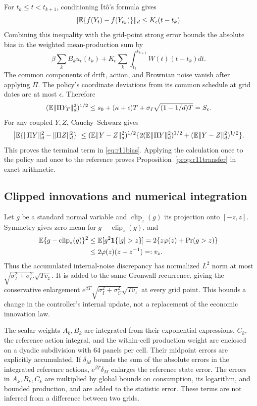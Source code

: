 For $t_k\leq t<t_{k+1}$, conditioning It\^o's formula gives
\[
 \|\mathbb E\{f(Y_t)-f(Y_{t_k})\}\|_d\leq K_\epsilon(t-t_k).
\]
Combining this inequality with the grid-point strong error bounds the absolute bias in the weighted mean-production sum by
\[
 \beta\sum_k B_k u_\epsilon(t_k)+
 K_\epsilon\sum_k\int_{t_k}^{t_{k+1}}W(t)(t-t_k)dt.
\]
The common components of drift, action, and Brownian noise vanish after applying $\Pi$. The policy's coordinate deviations from its common schedule at grid dates are at most $\epsilon$. Therefore
\[
 (\mathbb E\|\Pi Y_T\|_d^2)^{1/2}
 \leq s_0+(\kappa+\epsilon)T+\sigma_I\sqrt{(1-1/d)T}=S_\epsilon.
\]
For any coupled $Y,Z$, Cauchy--Schwarz gives
\[
 \left|\mathbb E\{\|\Pi Y\|_d^2-\|\Pi Z\|_d^2\}\right|
 \leq (\mathbb E\|Y-Z\|_d^2)^{1/2}
       \{2(\mathbb E\|\Pi Y\|_d^2)^{1/2}+(\mathbb E\|Y-Z\|_d^2)^{1/2}\}.
\]
This proves the terminal term in \eqref{eq:r11bias}. Applying the calculation once to the policy and once to the reference proves Proposition~\ref{prop:r11transfer} in exact arithmetic.

\subsection{Clipped innovations and numerical integration}
Let $g$ be a standard normal variable and $\operatorname{clip}_z(g)$ its projection onto $[-z,z]$. Symmetry gives zero mean for $g-\operatorname{clip}_z(g)$, and
\[
 \begin{aligned}\E\{g-\operatorname{clip}_z(g)\}^2
 &\leq \E[g^2\bm1\{|g|>z\}]
 =2\{z\varphi(z)+\Pr(g>z)\}\\
 &\leq2\varphi(z)(z+z^{-1})=:v_z.\end{aligned}
\]
Thus the accumulated internal-noise discrepancy has normalized $L^2$ norm at most
$\sqrt{\sigma_I^2+\sigma_C^2}\sqrt{Tv_z}$.
It is added to the same Gronwall recurrence, giving the conservative enlargement
$e^{\beta T}\sqrt{\sigma_I^2+\sigma_C^2}\sqrt{Tv_z}$ at every grid point. This bounds a change in the controller's internal update, not a replacement of the economic innovation law.

The scalar weights $A_k,B_k$ are integrated from their exponential expressions. $C_k$, the reference action integral, and the within-cell production weight are enclosed on a dyadic subdivision with 64 panels per cell. Their midpoint errors are explicitly accumulated. If $\delta_M$ bounds the sum of the absolute errors in the integrated reference actions, $e^{\beta T}\delta_M$ enlarges the reference state error. The errors in $A_k,B_k,C_k$ are multiplied by global bounds on consumption, its logarithm, and bounded production, and are added to the statistic error. These terms are not inferred from a difference between two grids.

